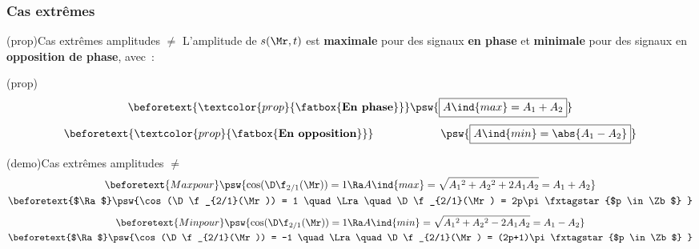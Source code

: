 \documentclass[../../main/main.tex]{subfiles}
\begin{document}

\subsubsection{Cas extrêmes}
\begin{tcb*}(prop){Cas extrêmes amplitudes $\neq$}
	L'amplitude de $s(\Mr,t)$ est \textbf{maximale} pour des signaux \textbf{en
		phase} et \textbf{minimale} pour des signaux en \textbf{opposition de phase},
	avec~:
	\smallbreak
	\begin{isd}(prop)
		\vspace{-15pt}
		\begin{gather*}
			\beforetext{\textcolor{prop}{\fatbox{\textbf{En phase}}}}
			\psw{\boxed{A\ind{max} = A_1+A_2}}
		\end{gather*}
		\vspace{-15pt}
		\tcblower
		\vspace{-15pt}
		\begin{gather*}
			\beforetext{\textcolor{prop}{\fatbox{\textbf{En opposition}}}}
			\hspace{60pt}
			\psw{\boxed{A\ind{min} = \abs{A_1-A_2}}}
		\end{gather*}
		\vspace{-15pt}
	\end{isd}
\end{tcb*}

\begin{tcb*}[breakable](demo){Cas extrêmes amplitudes $\neq$}
	\vspace{-15pt}
	\begin{gather*}
		\beforetext{Max pour}
		\psw{%
		\cos (\D\f_{2/1}(\Mr)) = 1
		\Ra
		A\ind{max} = \sqrt{A_1{}^2 + A_2{}^2 + 2A_1A_2} = A_1+A_2
		}%
		\\\beforetext{$\Ra$}
		\psw{%
			\cos (\D\f_{2/1}(\Mr)) = 1
			\quad \Lra \quad
			\D\f_{2/1}(\Mr) = 2p\pi
			\tag*{$p \in \Zb$}
		}%
	\end{gather*}
	\tcblower
	\vspace{-15pt}
	\begin{gather*}
		\beforetext{Min pour}
		\psw{%
		\cos (\D\f_{2/1}(\Mr)) = 1
		\Ra
		A\ind{min} = \sqrt{A_1{}^2 + A_2{}^2 - 2A_1A_2} = A_1-A_2
		}%
		\\\beforetext{$\Ra$}
		\psw{%
			\cos (\D\f_{2/1}(\Mr)) = -1
			\quad \Lra \quad
			\D\f_{2/1}(\Mr) = (2p+1)\pi
			\tag*{$p \in \Zb$}
		}%
	\end{gather*}
\end{tcb*}
\end{document}
